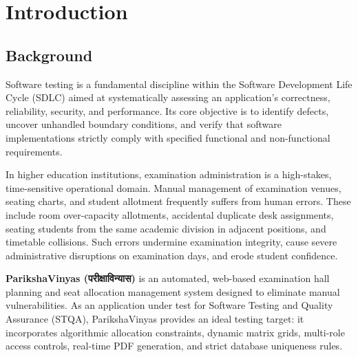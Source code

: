 \documentclass{InternshipReport}
\begin{document}
\clearpage
\listoffigures

\startchapterheader

\chapter{Introduction}

\section{Background}
Software testing is a fundamental discipline within the Software Development Life Cycle (SDLC) aimed at systematically assessing an application's correctness, reliability, security, and performance. Its core objective is to identify defects, uncover unhandled boundary conditions, and verify that software implementations strictly comply with specified functional and non-functional requirements.

In higher education institutions, examination administration is a high-stakes, time-sensitive operational domain. Manual management of examination venues, seating charts, and student allotment frequently suffers from human errors. These include room over-capacity allotments, accidental duplicate desk assignments, seating students from the same academic division in adjacent positions, and timetable collisions. Such errors undermine examination integrity, cause severe administrative disruptions on examination days, and erode student confidence.

\textbf{ParikshaVinyas (परीक्षाविन्यास)} is an automated, web-based examination hall planning and seat allocation management system designed to eliminate manual vulnerabilities. As an application under test for Software Testing and Quality Assurance (STQA), ParikshaVinyas provides an ideal testing target: it incorporates algorithmic allocation constraints, dynamic matrix grids, multi-role access controls, real-time PDF generation, and strict database uniqueness rules.
\end{document}
